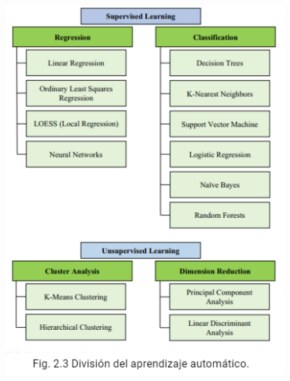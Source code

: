 \documentclass[crop=false]{standalone}
\begin{document}
\begin{center}
\includegraphics[width=0.8\textwidth]
{images/foto_texto_traducido_3.PNG}

\end{center}
\end{document}
